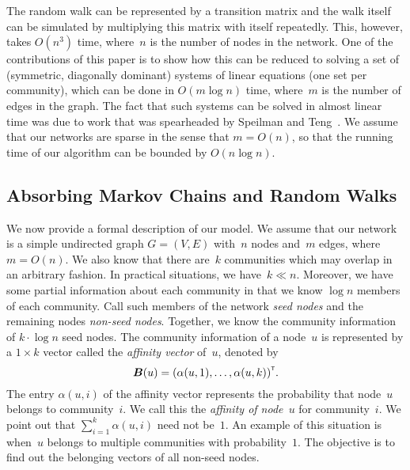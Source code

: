 The random walk can be represented by a transition matrix and the walk itself can be simulated 
by multiplying this matrix with itself repeatedly. This, however, takes $O(n^3)$
time, where~$n$ is the number of nodes in the network. One of the contributions of 
this paper is to show how this can be reduced to solving a set of (symmetric, diagonally dominant) 
systems of linear equations (one set per community), which can be done in $O(m \log n)$ time, 
where~$m$ is the number of edges in the graph. The fact that such systems can be solved in 
almost linear time was due to work that was spearheaded by Speilman and 
Teng~\cite{ST04,EEST05,ST08,KMP10,KMP11,Vis13}. We assume that our networks are 
sparse in the sense that $m = O(n)$, so that the running time of our algorithm can  
be bounded by $O(n \log n)$.    
        
\subsection{Absorbing Markov Chains and Random Walks}
We now provide a formal description of our model. We assume that our network 
is a simple undirected graph $G = (V,E)$ with~$n$ nodes and~$m$ edges, where $m = O(n)$.
We also know that there are~$k$ communities which may overlap in an arbitrary fashion.
In practical situations, we have~$k \ll n$. 
Moreover, we have some partial information about each community in that we know
$\log n$ members of each community. Call such members of the network \emph{seed nodes} 
and the remaining nodes \emph{non-seed nodes}. Together, we know the community information 
of $k \cdot \log n$ seed nodes. The community information of a node~$u$ is represented 
by a $1 \times k$ vector called the \emph{affinity vector} of~$u$, denoted 
by 
\[
	\boldsymbol{B} (u) = {\left ( \alpha (u, 1), \ldots, \alpha (u, k) \right )}^{\scriptscriptstyle \mathsf{T}}.
\] 
The entry $\alpha (u, i)$ of the affinity vector represents the probability that 
node~$u$ belongs to community~$i$.  We call this the \emph{affinity of node~$u$} for 
community~$i$. We point out that $\sum_{i = 1}^k \alpha (u, i)$ 
need not be~$1$. An example of this situation is when~$u$ belongs to multiple 
communities with probability~$1$. The objective is to find out the belonging 
vectors of all non-seed nodes. 

